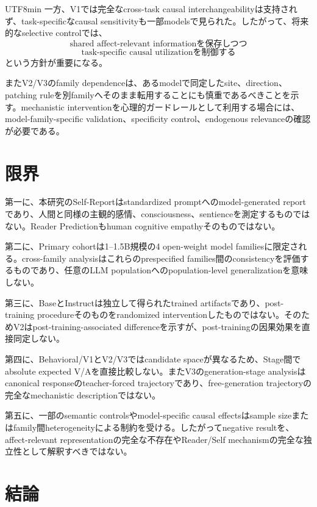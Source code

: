 \documentclass{article} %
\begin{document}
\begin{CJK*}{UTF8}{min}
一方、V1では完全なcross-task causal interchangeabilityは支持されず、task-specificなcausal sensitivityも一部modelsで見られた。したがって、将来的なselective controlでは、
\[
\text{shared affect-relevant informationを保存しつつ}
\]
\[
\text{task-specific causal utilizationを制御する}
\]
という方針が重要になる。

またV2/V3のfamily dependenceは、あるmodelで同定したsite、direction、patching ruleを別familyへそのまま転用することにも慎重であるべきことを示す。mechanistic interventionを心理的ガードレールとして利用する場合には、model-family-specific validation、specificity control、endogenous relevanceの確認が必要である。


\section{限界}
\label{sec:limitations}

第一に、本研究のSelf-Reportはstandardized promptへのmodel-generated reportであり、人間と同様の主観的感情、consciousness、sentienceを測定するものではない。Reader Predictionもhuman cognitive empathyそのものではない。

第二に、Primary cohortは1--1.5B規模の4 open-weight model familiesに限定される。cross-family analysisはこれらのprespecified families間のconsistencyを評価するものであり、任意のLLM populationへのpopulation-level generalizationを意味しない。

第三に、BaseとInstructは独立して得られたtrained artifactsであり、post-training procedureそのものをrandomized interventionしたものではない。そのためV2はpost-training-associated differenceを示すが、post-trainingの因果効果を直接同定しない。

第四に、Behavioral/V1とV2/V3ではcandidate spaceが異なるため、Stage間でabsolute expected V/Aを直接比較しない。またV3のgeneration-stage analysisはcanonical responseのteacher-forced trajectoryであり、free-generation trajectoryの完全なmechanistic descriptionではない。

第五に、一部のsemantic controlsやmodel-specific causal effectsはsample sizeまたはfamily間heterogeneityによる制約を受ける。したがってnegative resultを、affect-relevant representationの完全な不存在やReader/Self mechanismの完全な独立性として解釈すべきではない。


\section{結論}
\label{sec:conclusion}


\end{CJK*}
\end{document}

